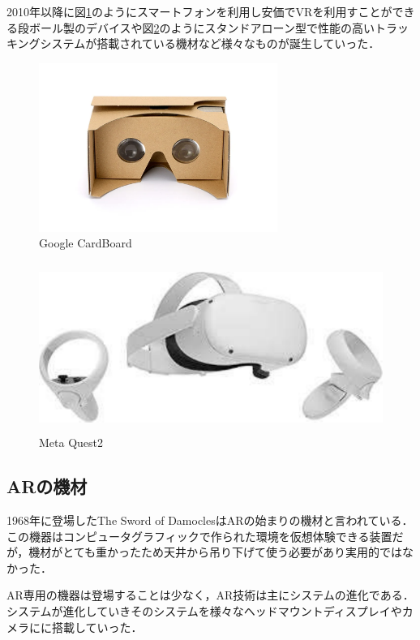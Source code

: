 \documentclass[12pt,a4j]{ltjsarticle}
\begin{document}
2010年以降に図\ref{fig:Google_CardBord.pdf}のようにスマートフォンを利用し安価でVRを利用すことができる段ボール製のデバイスや図\ref{fig:Meta_Quest2.pdf}のようにスタンドアローン型で性能の高いトラッキングシステムが搭載されている機材など様々なものが誕生していった．
\begin{figure}[h]
\begin{center}
 \includegraphics[clip,height=55mm]{Google_CardBord.pdf}
\end{center}
 \caption{Google CardBoard}
 \label{fig:Google_CardBord.pdf}
\end{figure}

\begin{figure}[h]
\begin{center}
 \includegraphics[clip,height=55mm]{Meta_Quest2.pdf}
\end{center}
 \caption{Meta Quest2}
 \label{fig:Meta_Quest2.pdf}
\end{figure}

\subsection{ARの機材}
1968年に登場したThe Sword of DamoclesはARの始まりの機材と言われている．
この機器はコンピュータグラフィックで作られた環境を仮想体験できる装置だが，機材がとても重かったため天井から吊り下げて使う必要があり実用的ではなかった．

AR専用の機器は登場することは少なく，AR技術は主にシステムの進化である．
システムが進化していきそのシステムを様々なヘッドマウントディスプレイやカメラにに搭載していった．
\end{document}

